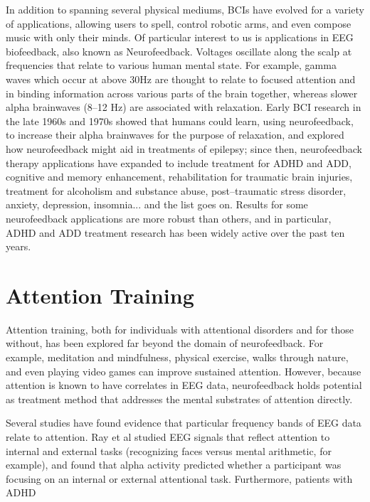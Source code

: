 \documentclass[12pt]{report}
\begin{document}
	In addition to spanning several physical mediums, BCIs have evolved for a variety of applications, allowing users to spell\cite{Kaper}, control robotic arms\cite{Chae}, and even compose music\cite{Yao} with only their minds.  Of particular interest to us is applications in EEG biofeedback, also known as Neurofeedback.  Voltages oscillate along the scalp at frequencies that relate to various human mental state.  For example, gamma waves which occur at above 30Hz are thought to relate to focused attention and in binding information across various parts of the brain together, whereas slower alpha brainwaves (8--12 Hz) are associated with relaxation\cite{Hammond}.  Early BCI research in the late 1960s and 1970s showed that humans could learn, using neurofeedback, to increase their alpha  brainwaves for the purpose of relaxation, and explored how neurofeedback might aid in treatments of epilepsy; since then, neurofeedback therapy applications have expanded to include treatment for ADHD and ADD, cognitive and memory enhancement, rehabilitation for traumatic brain injuries, treatment for alcoholism and substance abuse, post--traumatic stress disorder, anxiety, depression, insomnia... and the list goes on\cite{Hammond}.  Results for some neurofeedback applications are more robust than others, and in particular, ADHD and ADD treatment research has been widely active over the past ten years.  

\section{Attention Training}

	Attention training, both for individuals with attentional disorders and for those without, has been explored far beyond the domain of neurofeedback.  For example, meditation and mindfulness, physical exercise, walks through nature, and even playing video games can improve sustained attention\cite{TurkBrowne}.  However, because attention is known to have correlates in EEG data, neurofeedback holds potential as treatment method that addresses the mental substrates of attention directly.
	
	Several studies have found evidence that particular frequency bands of EEG data relate to attention.  Ray et al\cite{Ray} studied EEG signals that reflect attention to internal and external tasks (recognizing faces versus mental arithmetic, for example), and found that alpha activity predicted whether a participant was focusing on an internal or external attentional task.  Furthermore, patients with ADHD 
\end{document}
